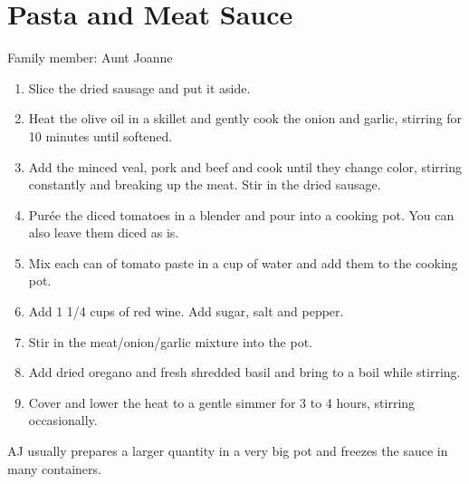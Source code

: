 \chapter{Pasta and Meat Sauce}
\label{ch:pastameatsauce}


Family member: Aunt Joanne

\begin{enumerate}
    \item Slice the dried sausage and put it aside.
    \item Heat the olive oil in a skillet and gently cook the onion and garlic, stirring for 10 minutes until softened.
    \item Add the minced veal, pork and beef and cook until they change color, stirring constantly and breaking up the meat. Stir in the dried sausage.
    \item Purée the diced tomatoes in a blender and pour into a cooking pot. You can also leave them diced as is.
    \item Mix each can of tomato paste in a cup of water and add them to the cooking pot.
    \item Add 1 1/4 cups of red wine. Add sugar, salt and pepper.
    \item Stir in the meat/onion/garlic mixture into the pot.
    \item Add dried oregano and fresh shredded basil and bring to a boil while stirring.
    \item Cover and lower the heat to a gentle simmer for 3 to 4 hours, stirring occasionally.
\end{enumerate}

AJ usually prepares a larger quantity in a very big pot and freezes the sauce in many containers.

